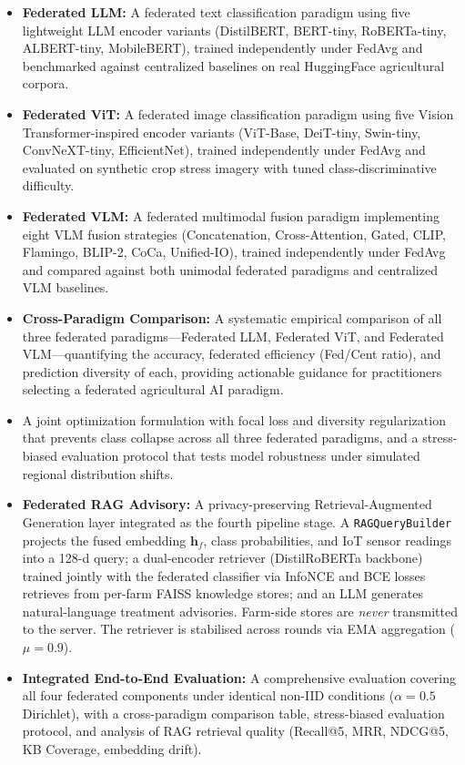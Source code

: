 \documentclass[10pt,journal,compsoc]{IEEEtran}
\begin{document}
\begin{itemize}[leftmargin=*]
    \item \textbf{Federated LLM:} A federated text classification paradigm using five lightweight LLM encoder variants (DistilBERT, BERT-tiny, RoBERTa-tiny, ALBERT-tiny, MobileBERT), trained independently under FedAvg and benchmarked against centralized baselines on real HuggingFace agricultural corpora.

    \item \textbf{Federated ViT:} A federated image classification paradigm using five Vision Transformer-inspired encoder variants (ViT-Base, DeiT-tiny, Swin-tiny, ConvNeXT-tiny, EfficientNet), trained independently under FedAvg and evaluated on synthetic crop stress imagery with tuned class-discriminative difficulty.

    \item \textbf{Federated VLM:} A federated multimodal fusion paradigm implementing eight VLM fusion strategies (Concatenation, Cross-Attention, Gated, CLIP, Flamingo, BLIP-2, CoCa, Unified-IO), trained independently under FedAvg and compared against both unimodal federated paradigms and centralized VLM baselines.

    \item \textbf{Cross-Paradigm Comparison:} A systematic empirical comparison of all three federated paradigms---Federated LLM, Federated ViT, and Federated VLM---quantifying the accuracy, federated efficiency (Fed/Cent ratio), and prediction diversity of each, providing actionable guidance for practitioners selecting a federated agricultural AI paradigm.

    \item A joint optimization formulation with focal loss and diversity regularization that prevents class collapse across all three federated paradigms, and a stress-biased evaluation protocol that tests model robustness under simulated regional distribution shifts.

    \item \textbf{Federated RAG Advisory:} A privacy-preserving Retrieval-Augmented Generation layer integrated as the fourth pipeline stage. A \texttt{RAGQueryBuilder} projects the fused embedding $\mathbf{h}_f$, class probabilities, and IoT sensor readings into a 128-d query; a dual-encoder retriever (DistilRoBERTa backbone) trained jointly with the federated classifier via InfoNCE and BCE losses retrieves from per-farm FAISS knowledge stores; and an LLM generates natural-language treatment advisories. Farm-side stores are \emph{never} transmitted to the server. The retriever is stabilised across rounds via EMA aggregation ($\mu{=}0.9$).

    \item \textbf{Integrated End-to-End Evaluation:} A comprehensive evaluation covering all four federated components under identical non-IID conditions ($\alpha{=}0.5$ Dirichlet), with a cross-paradigm comparison table, stress-biased evaluation protocol, and analysis of RAG retrieval quality (Recall@5, MRR, NDCG@5, KB Coverage, embedding drift).
\end{itemize}
\end{document}
